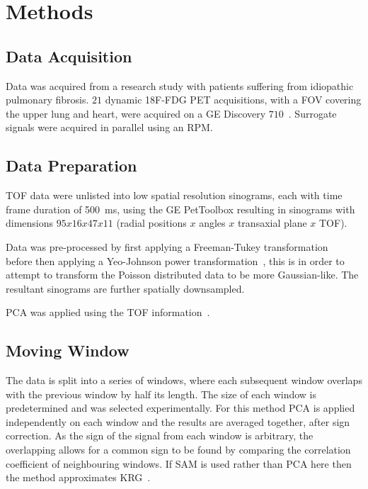 \section{Methods} \label{sec:methods}
    \subsection{Data Acquisition} \label{sec:data_acquisition}
        Data was acquired from a research study with patients suffering from idiopathic pulmonary fibrosis. $21$ dynamic \acrshort{18F-FDG} \acrshort{PET} acquisitions, with a \acrlong{FOV} covering the upper lung and heart, were acquired on a \acrshort{GE} Discovery $710$~\cite{Oh2019OptimalTreatment, Emond2020EffectReconstruction}. Surrogate signals were acquired in parallel using an \gls{RPM}.
    
    \vspace{-0.5cm}
        
    \subsection{Data Preparation} \label{sec:data_preparation}
        \gls{TOF} data were unlisted into low spatial resolution sinograms, each with time frame duration of \SI{500}{\milli\second}, using the \acrshort{GE} PetToolbox resulting in sinograms with dimensions $95 x 16 x 47 x 11$ (radial positions $x$ angles $x$ transaxial plane $x$ \gls{TOF}).
        
        Data was pre-processed by first applying a Freeman-Tukey transformation~\cite{Freeman1950TransformationsRoot} before then applying a Yeo-Johnson power transformation~\cite{Yeo2000ASymmetry}, this is in order to attempt to transform the Poisson distributed data to be more Gaussian-like. The resultant sinograms are further spatially downsampled.
        
        \gls{PCA} was applied using the \gls{TOF} information~\cite{Bertolli2017DataData}.
    
    \vspace{-0.5cm}
        
    \subsection{Moving Window} \label{sec:moving_window}
        The data is split into a series of windows, where each subsequent window overlaps with the previous window by half its length. The size of each window is predetermined and was selected experimentally. For this method \gls{PCA} is applied independently on each window and the results are averaged together, after sign correction. As the sign of the signal from each window is arbitrary,  the overlapping allows for a common sign to be found by comparing the correlation coefficient of neighbouring windows. If \gls{SAM} is used rather than \gls{PCA} here then the method approximates \gls{KRG}~\cite{Schleyer2014}.
        
